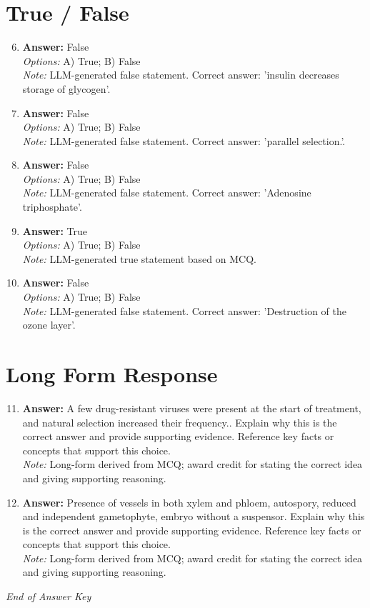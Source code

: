 \documentclass[12pt]{article}
\begin{document}
\section*{True / False}
\begin{enumerate}[label=\arabic*.]
\setcounter{enumi}{5}
\item \textbf{Answer:} False
\\ \textit{Options:} A) True; B) False
\\ \textit{Note:} LLM-generated false statement. Correct answer: 'insulin decreases storage of glycogen'.
\item \textbf{Answer:} False
\\ \textit{Options:} A) True; B) False
\\ \textit{Note:} LLM-generated false statement. Correct answer: 'parallel selection.'.
\item \textbf{Answer:} False
\\ \textit{Options:} A) True; B) False
\\ \textit{Note:} LLM-generated false statement. Correct answer: 'Adenosine triphosphate'.
\item \textbf{Answer:} True
\\ \textit{Options:} A) True; B) False
\\ \textit{Note:} LLM-generated true statement based on MCQ.
\item \textbf{Answer:} False
\\ \textit{Options:} A) True; B) False
\\ \textit{Note:} LLM-generated false statement. Correct answer: 'Destruction of the ozone layer'.
\end{enumerate}

\section*{Long Form Response}
\begin{enumerate}[label=\arabic*.]
\setcounter{enumi}{10}
\item \textbf{Answer:} A few drug-resistant viruses were present at the start of treatment, and natural selection increased their frequency.. Explain why this is the correct answer and provide supporting evidence. Reference key facts or concepts that support this choice.
\\ \textit{Note:} Long-form derived from MCQ; award credit for stating the correct idea and giving supporting reasoning.
\item \textbf{Answer:} Presence of vessels in both xylem and phloem, autospory, reduced and independent gametophyte, embryo without a suspensor. Explain why this is the correct answer and provide supporting evidence. Reference key facts or concepts that support this choice.
\\ \textit{Note:} Long-form derived from MCQ; award credit for stating the correct idea and giving supporting reasoning.
\end{enumerate}

\vfill
\noindent\textit{End of Answer Key}
\end{document}
